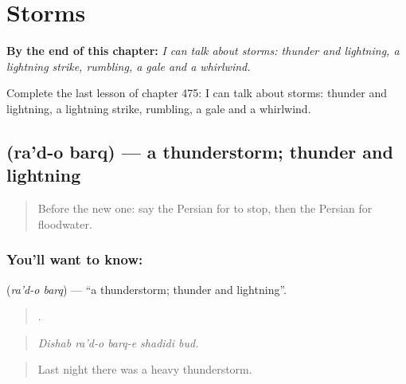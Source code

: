 
\chapter{Storms}
\label{ch:fa-storms}

\begin{chapteropening}
\textbf{By the end of this chapter:} \emph{I can talk about storms: thunder and lightning, a lightning strike, rumbling, a gale and a whirlwind.}

Complete the last lesson of chapter 475: I can talk about storms: thunder and lightning, a lightning strike, rumbling, a gale and a whirlwind.
\end{chapteropening}

\section[\texorpdfstring{\fa{رعد} \fa{و} \fa{برق} (ra'd-o barq)}{رعد و برق (ra'd-o barq)}]{   (ra'd-o barq) — a thunderstorm; thunder and lightning}

\label{lesson:FA-C475-rad-o-barq}



\begin{quote}
Before the new one: say the Persian for to stop, then the Persian for floodwater.
\end{quote}

\subsection*{You'll want to know:   }
\textbf{  } (\emph{ra'd-o barq}) — \textquotedblleft{}a thunderstorm; thunder and lightning\textquotedblright{}.

\begin{quote}
     .
\end{quote}

\begin{quote}
\emph{Dishab ra'd-o barq-e shadidi bud.}
\end{quote}

\begin{quote}
Last night there was a heavy thunderstorm.
\end{quote}


